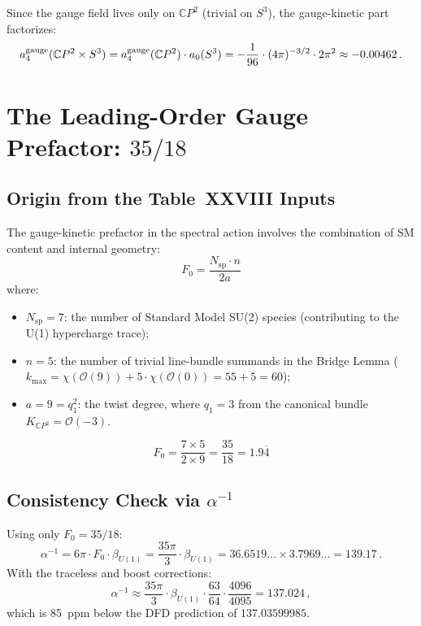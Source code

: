 \documentclass[12pt,a4paper]{article}
\theoremstyle{definition}
\begin{document}
Since the gauge field lives only on $\mathbb{C}P^2$ (trivial on $S^3$),
the gauge-kinetic part factorizes:
\begin{equation}
a_4^{\rm gauge}(\mathbb{C}P^2 \times S^3)
= a_4^{\rm gauge}(\mathbb{C}P^2) \cdot a_0(S^3)
= -\frac{1}{96}\cdot (4\pi)^{-3/2}\cdot 2\pi^2
\approx -0.00462\,.
\end{equation}

\section{The Leading-Order Gauge Prefactor: $35/18$}
\label{sec:35-over-18}

\subsection{Origin from the Table~XXVIII Inputs}

The gauge-kinetic prefactor in the spectral action involves the combination
of SM content and internal geometry:
\begin{equation}
F_0 = \frac{N_{\mathrm{sp}} \cdot n}{2a}
\end{equation}
where:
\begin{itemize}
\item $N_{\mathrm{sp}} = 7$: the number of Standard Model SU(2) species
  (contributing to the U(1) hypercharge trace);
\item $n = 5$: the number of trivial line-bundle summands in the Bridge Lemma
  ($k_{\max} = \chi(\mathcal{O}(9)) + 5 \cdot \chi(\mathcal{O}(0)) = 55 + 5 = 60$);
\item $a = 9 = q_1^2$: the twist degree, where $q_1 = 3$ from the canonical
  bundle $K_{\mathbb{C}P^2} = \mathcal{O}(-3)$.
\end{itemize}

\begin{equation}
\boxed{F_0 = \frac{7 \times 5}{2 \times 9} = \frac{35}{18} = 1.9\overline{4}}
\end{equation}

\subsection{Consistency Check via $\alpha^{-1}$}

Using only $F_0 = 35/18$:
\begin{equation}
\alpha^{-1} = 6\pi \cdot F_0 \cdot \beta_{U(1)} = \frac{35\pi}{3}\cdot\beta_{U(1)}
= 36.6519\ldots \times 3.7969\ldots = 139.17\,.
\end{equation}
With the traceless and boost corrections:
\begin{equation}
\alpha^{-1} \approx \frac{35\pi}{3}\cdot\beta_{U(1)}\cdot\frac{63}{64}\cdot\frac{4096}{4095}
= 137.024\,,
\end{equation}
which is 85~ppm below the DFD prediction of $137.03599985$.
\end{document}
